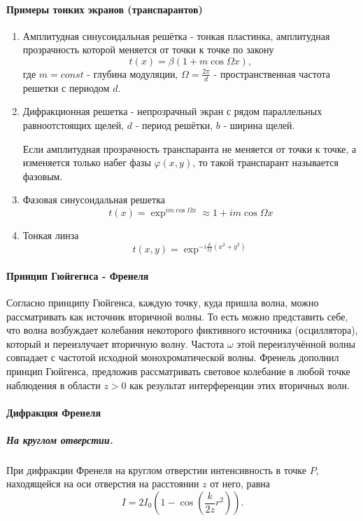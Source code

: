 \documentclass[12pt]{article}
\renewcommand{\phi}{\ensuremath{\varphi}}
\begin{document}
		\paragraph{Примеры тонких экранов (транспарантов)}
		
		\begin{enumerate}
			\item Амплитудная синусоидальная решётка - тонкая пластинка, амплитудная прозрачность которой меняется от точки к точке по закону
			$$t(x) = \beta(1 + m\cos \Omega x),$$
			где $m=const$ - глубина модуляции, $\Omega = \frac{2\pi}{d}$ - пространственная частота решетки с периодом $d$.
			
			\item Дифракционная решетка - непрозрачный экран с рядом параллельных равноотстоящих щелей, $d$ -  период решётки, $b$ - ширина щелей.
			
			
			Если амплитудная прозрачность транспаранта не меняется от точки к точке, а изменяется только набег фазы $\phi(x, y)$, то такой транспарант называется фазовым. 
			\item Фазовая синусоидальная решетка
			$$t(x) = \exp^{im\cos\Omega x} \approx 1 + im\cos \Omega x$$
			
			\item Тонкая линза
			$$t(x, y) = \exp^{-i\frac{k}{2f}(x^2 + y^2)}$$
			
		\end{enumerate}
	
	\paragraph{Принцип Гюйгегнса - Френеля}
	
	Согласно принципу Гюйгенса, каждую точку,
	куда пришла волна, можно рассматривать как источник вторичной волны. То есть можно представить	себе, что волна возбуждает колебания некоторого фиктивного источника (осциллятора), который и переизлучает вторичную волну. Частота $\omega$
	этой переизлучённой волны совпадает с частотой исходной монохроматической волны. Френель дополнил принцип Гюйгенса, предложив
	рассматривать световое колебание в любой точке наблюдения в области
	$z > 0$ как результат интерференции этих вторичных волн.
	
	\paragraph{Дифракция Френеля}
	
	\subparagraph{На круглом отверстии.}При дифракции Френеля на круглом отверстии интенсивность в точке $P$, находящейся на оси отверстия на расстоянии $z$ от него, равна
	$$I = 2I_0(1-\cos(\dfrac{k}{2z}r^2)).$$
	
\end{document}

